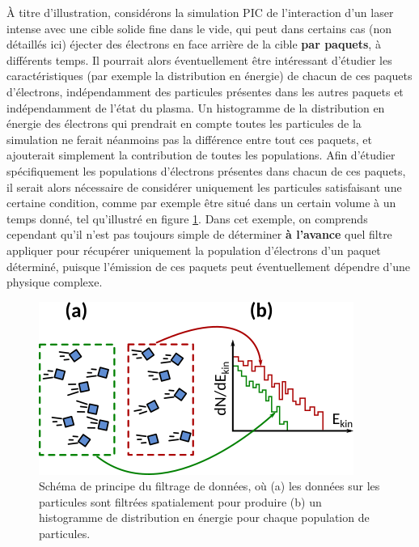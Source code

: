 \begin{refsection}
À titre d'illustration, considérons la simulation PIC de l'interaction d'un laser intense avec une cible solide fine dans le vide, qui peut dans certains cas (non détaillés ici) éjecter des électrons en face arrière de la cible \textbf{par paquets}, à différents temps. Il pourrait alors éventuellement être intéressant d'étudier les caractéristiques (par exemple la distribution en énergie) de chacun de ces paquets d'électrons, indépendamment des particules présentes dans les autres paquets et indépendamment de l'état du plasma. Un histogramme de la distribution en énergie des électrons qui prendrait en compte toutes les particules de la simulation ne ferait néanmoins pas la différence entre tout ces paquets, et ajouterait simplement la contribution de toutes les populations. Afin d'étudier spécifiquement les populations d'électrons présentes dans chacun de ces paquets, il serait alors nécessaire de considérer uniquement les particules satisfaisant une certaine condition, comme par exemple être situé dans un certain volume à un temps donné, tel qu'illustré en figure \ref{fig:4-p2sat_filtre}. Dans cet exemple, on comprends cependant qu'il n'est pas toujours simple de déterminer \textbf{à l'avance} quel filtre appliquer pour récupérer uniquement la population d'électrons d'un paquet déterminé, puisque l'émission de ces paquets peut éventuellement dépendre d'une physique complexe. 

\begin{figure}[hbtp]
	\centering
	\includegraphics[width=0.7\linewidth]{4-simulation/p2sat_filtering.png}
	\caption{Schéma de principe du filtrage de données, où (a) les données sur les particules sont filtrées spatialement pour produire (b) un histogramme de distribution en énergie pour chaque population de particules.}
	\label{fig:4-p2sat_filtre}
\end{figure}


\end{refsection}
